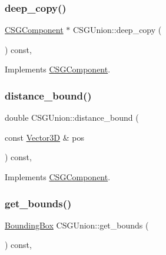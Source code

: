 \subsubsection{\texorpdfstring{deep\_copy()}{deep\_copy()}}
{\footnotesize\ttfamily \mbox{\hyperlink{classCSGComponent}{C\+S\+G\+Component}} $\ast$ C\+S\+G\+Union\+::deep\+\_\+copy (\begin{DoxyParamCaption}{ }\end{DoxyParamCaption}) const\hspace{0.3cm}{\ttfamily [override]}, {\ttfamily [virtual]}}



Implements \mbox{\hyperlink{classCSGComponent_a98d3accd23c28259cbf490f4d7acbe83}{C\+S\+G\+Component}}.

\mbox{\label{classCSGUnion_a2a15937802a57a3a78b84961fc0dda9f}} 
\subsubsection{\texorpdfstring{distance\_bound()}{distance\_bound()}}
{\footnotesize\ttfamily double C\+S\+G\+Union\+::distance\+\_\+bound (\begin{DoxyParamCaption}\item[{const \mbox{\hyperlink{classVector3D}{Vector3D}} \&}]{pos }\end{DoxyParamCaption}) const\hspace{0.3cm}{\ttfamily [override]}, {\ttfamily [virtual]}}



Implements \mbox{\hyperlink{classCSGComponent_a41ca7aff9b7c481ea076f81eeb826779}{C\+S\+G\+Component}}.

\mbox{\label{classCSGUnion_aaf1d2e77d8f931327fd8c499933142ba}} 
\subsubsection{\texorpdfstring{get\_bounds()}{get\_bounds()}}
{\footnotesize\ttfamily \mbox{\hyperlink{classBoundingBox}{Bounding\+Box}} C\+S\+G\+Union\+::get\+\_\+bounds (\begin{DoxyParamCaption}{ }\end{DoxyParamCaption}) const\hspace{0.3cm}{\ttfamily [override]}, {\ttfamily [virtual]}}




